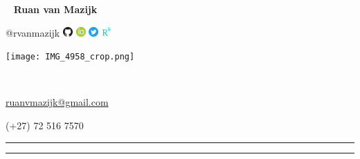 \begin{multicols}{3}
  \
  \vfill
  \raggedleft
    {\Large \textbf{Ruan van Mazijk}} \par
    {\large @rvanmazijk}
    \href{https://github.com/rvanmazijk}
         {\includegraphics[width=1em]{logos/GitHub.png}}
    \href{https://orcid.org/0000-0003-2659-6909}
         {\includegraphics[width=1em]{logos/ORCID.png}}
    \href{https://twitter.com/rvanmazijk}
         {\includegraphics[width=1em]{logos/Twitter.png}}
    \href{https://www.researchgate.net/profile/Ruan-Van-Mazijk}
         {\includegraphics[width=1em]{logos/ResearchGate-white_crop.jpg}}
  \vfill
  \
  
  \columnbreak
  \begin{center}
    \texttt{[image: IMG\_4958\_crop.png]}
  \end{center}
  \columnbreak
  \par
  
  \
  \vfill
  \raggedright
    {\large \href{mailto:ruanvmazijk@gmail.com}{ruanvmazijk@gmail.com}} \par
    (+27) 72 516 7570
  \vfill
  \
\end{multicols}

\hrule \vskip2pt \hrule
